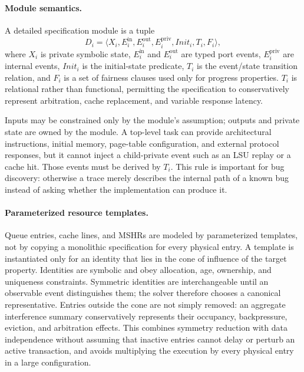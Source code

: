 \paragraph{Module semantics.}
A detailed specification module is a tuple
\begin{equation}
  D_i=\langle X_i,E_i^{\mathrm{in}},E_i^{\mathrm{out}},
  E_i^{\mathrm{priv}},Init_i,T_i,F_i\rangle,
\end{equation}
where $X_i$ is private symbolic state, $E_i^{\mathrm{in}}$ and
$E_i^{\mathrm{out}}$ are typed port events, $E_i^{\mathrm{priv}}$ are internal
events, $Init_i$ is the initial-state predicate, $T_i$ is the event/state
transition relation, and $F_i$ is a set of fairness clauses used only for
progress properties.  $T_i$ is relational rather than functional, permitting
the specification to conservatively represent arbitration, cache replacement,
and variable response latency.

Inputs may be constrained only by the module's assumption; outputs and private
state are owned by the module.  A top-level task can provide architectural
instructions, initial memory, page-table configuration, and external protocol
responses, but it cannot inject a child-private event such as an LSU replay or
a cache hit.  Those events must be derived by $T_i$.  This rule is important
for bug discovery: otherwise a trace merely describes the internal path of a
known bug instead of asking whether the implementation can produce it.

\paragraph{Parameterized resource templates.}
Queue entries, cache lines, and MSHRs are modeled by parameterized templates,
not by copying a monolithic specification for every physical entry.  A template
is instantiated only for an identity that lies in the cone of influence of the
target property.  Identities are symbolic and obey allocation, age, ownership,
and uniqueness constraints.  Symmetric identities are interchangeable until
an observable event distinguishes them; the solver therefore chooses a
canonical representative.  Entries outside the cone are not simply removed:
an aggregate interference summary conservatively represents their occupancy,
backpressure, eviction, and arbitration effects.  This combines symmetry
reduction with data independence without assuming that inactive entries cannot
delay or perturb an active transaction, and avoids multiplying the execution
by every physical entry in a large configuration.

